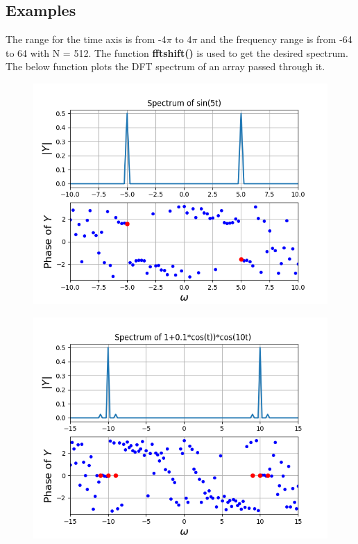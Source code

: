 \documentclass[12pt, a4paper]{report}
\begin{document}
\subsection{Examples }
The range for the time axis is from -4$\pi$ to 4$\pi$ and the frequency range is from -64 to 64 with N = 512. The function \textbf{fftshift()} is used to get the desired spectrum. The below function plots the DFT spectrum of an array passed through it.
\noindent

\begin{figure}[h!]
    \centering
    \includegraphics[scale=0.7]{fig1.png} 
    \caption{}
    \label{fig:my_label}
\end{figure}
\begin{figure}[h!]
    \centering
    \includegraphics[scale=0.7]{fig2.png} 
    \caption{}
    \label{fig:my_label}
\end{figure}
\end{document}
